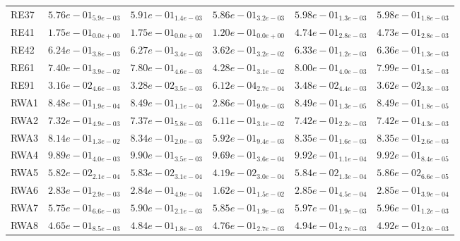 \documentclass{article}
\begin{document}
\begin{table}
\begin{scriptsize}
\begin{tabular}{llllll}
RE37 & $  5.76e-01_{ 5.9e-03}$ & $  5.91e-01_{ 1.4e-03}$ & $  5.86e-01_{ 3.2e-03}$ & \cellcolor{gray95}$  5.98e-01_{ 1.3e-03}$ & \cellcolor{gray25}$  5.98e-01_{ 1.8e-03}$ \\
RE41 & $  1.75e-01_{ 0.0e+00}$ & $  1.75e-01_{ 0.0e+00}$ & $  1.20e-01_{ 0.0e+00}$ & \cellcolor{gray95}$  4.74e-01_{ 2.8e-03}$ & \cellcolor{gray25}$  4.73e-01_{ 2.8e-03}$ \\
RE42 & $  6.24e-01_{ 3.8e-03}$ & $  6.27e-01_{ 3.4e-03}$ & $  3.62e-01_{ 3.2e-02}$ & \cellcolor{gray25}$  6.33e-01_{ 1.2e-03}$ & \cellcolor{gray95}$  6.36e-01_{ 1.3e-03}$ \\
RE61 & $  7.40e-01_{ 3.9e-02}$ & $  7.80e-01_{ 4.6e-03}$ & $  4.28e-01_{ 3.1e-02}$ & \cellcolor{gray95}$  8.00e-01_{ 4.0e-03}$ & \cellcolor{gray25}$  7.99e-01_{ 3.5e-03}$ \\
RE91 & $  3.16e-02_{ 4.6e-03}$ & $  3.28e-02_{ 3.5e-03}$ & $  6.12e-04_{ 2.7e-04}$ & \cellcolor{gray25}$  3.48e-02_{ 4.4e-03}$ & \cellcolor{gray95}$  3.62e-02_{ 3.3e-03}$ \\
RWA1 & $  8.48e-01_{ 1.9e-04}$ & $  8.49e-01_{ 1.1e-04}$ & $  2.86e-01_{ 9.0e-03}$ & \cellcolor{gray95}$  8.49e-01_{ 1.3e-05}$ & \cellcolor{gray25}$  8.49e-01_{ 1.8e-05}$ \\
RWA2 & $  7.32e-01_{ 4.9e-03}$ & $  7.37e-01_{ 5.8e-03}$ & $  6.11e-01_{ 3.1e-02}$ & \cellcolor{gray95}$  7.42e-01_{ 2.2e-03}$ & \cellcolor{gray25}$  7.42e-01_{ 4.3e-03}$ \\
RWA3 & $  8.14e-01_{ 1.3e-02}$ & $  8.34e-01_{ 2.0e-03}$ & $  5.92e-01_{ 9.4e-03}$ & \cellcolor{gray25}$  8.35e-01_{ 1.6e-03}$ & \cellcolor{gray95}$  8.35e-01_{ 2.6e-03}$ \\
RWA4 & $  9.89e-01_{ 4.0e-03}$ & $  9.90e-01_{ 3.5e-03}$ & $  9.69e-01_{ 3.6e-04}$ & \cellcolor{gray25}$  9.92e-01_{ 1.1e-04}$ & \cellcolor{gray95}$  9.92e-01_{ 8.4e-05}$ \\
RWA5 & $  5.82e-02_{ 2.1e-04}$ & $  5.83e-02_{ 3.1e-04}$ & $  4.19e-02_{ 3.0e-04}$ & \cellcolor{gray25}$  5.84e-02_{ 1.3e-04}$ & \cellcolor{gray95}$  5.86e-02_{ 6.6e-05}$ \\
RWA6 & $  2.83e-01_{ 2.9e-03}$ & $  2.84e-01_{ 4.9e-04}$ & $  1.62e-01_{ 1.5e-02}$ & \cellcolor{gray25}$  2.85e-01_{ 4.5e-04}$ & \cellcolor{gray95}$  2.85e-01_{ 3.9e-04}$ \\
RWA7 & $  5.75e-01_{ 6.6e-03}$ & $  5.90e-01_{ 2.1e-03}$ & $  5.85e-01_{ 1.9e-03}$ & \cellcolor{gray95}$  5.97e-01_{ 1.9e-03}$ & \cellcolor{gray25}$  5.96e-01_{ 1.2e-03}$ \\
RWA8 & $  4.65e-01_{ 8.5e-03}$ & $  4.84e-01_{ 1.8e-03}$ & $  4.76e-01_{ 2.7e-03}$ & \cellcolor{gray95}$  4.94e-01_{ 2.7e-03}$ & \cellcolor{gray25}$  4.92e-01_{ 2.0e-03}$ \\

\end{tabular}
\end{scriptsize}
\end{table}
\end{document}
